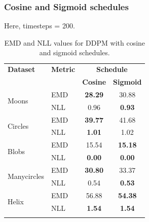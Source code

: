 \documentclass[11pt]{article}
\begin{document}
\subsubsection{Cosine and Sigmoid schedules}
Here, timesteps = 200.
\begin{longtable}{|l|l|c|c|}
    \hline
     \textbf{Dataset} & \textbf{Metric} & \multicolumn{2}{c|}{\textbf{Schedule}} \\
     \cline{3-4}
     & & \textbf{Cosine} & \textbf{Sigmoid} \\
    \hline
        \multirow{2}{*}{Moons} & EMD & \textbf{28.29} & 30.88 \\
        \cline{2-4}
        & NLL & 0.96 & \textbf{0.93} \\
        \hline
        \multirow{2}{*}{Circles} & EMD & \textbf{39.77} & 41.68 \\
        \cline{2-4}
        & NLL & \textbf{1.01} & 1.02 \\
        \hline
        \multirow{2}{*}{Blobs} & EMD & 15.54 & \textbf{15.18} \\
        \cline{2-4}
        & NLL & \textbf{0.00} & \textbf{0.00} \\
        \hline
        \multirow{2}{*}{Manycircles} & EMD & \textbf{30.80} & 33.37 \\
        \cline{2-4}
        & NLL & 0.54 & \textbf{0.53} \\
        \hline
        \multirow{2}{*}{Helix} & EMD & 56.88 & \textbf{54.38} \\
        \cline{2-4}
        & NLL & \textbf{1.54} & \textbf{1.54} \\
        \hline
        \caption{EMD and NLL values for DDPM with cosine and sigmoid schedules.}
\end{longtable}
\end{document}
